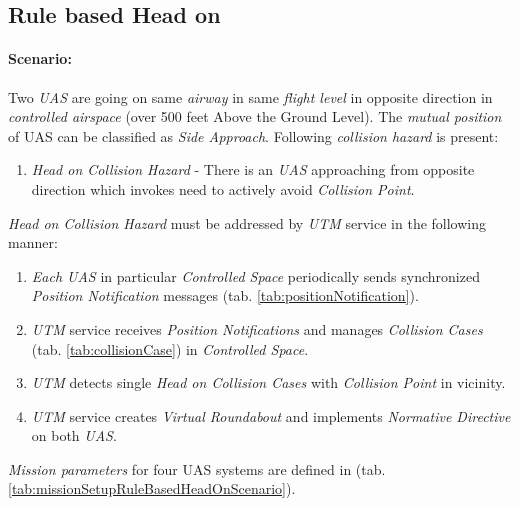 \subsection{Rule based Head on}\label{s:testRuleHeadOn}

\paragraph{Scenario:} Two \emph{UAS} are going on same \emph{airway} in same \emph{flight level} in opposite direction in \emph{controlled airspace} (over 500 feet Above the Ground Level). The \emph{mutual position} of UAS can be classified as \emph{Side Approach}. Following \emph{collision hazard} is present:

\begin{enumerate}
    \item \emph{Head on Collision Hazard} - There is an \emph{UAS} approaching from opposite direction which invokes need to actively avoid \emph{Collision Point}.
\end{enumerate}
      
\noindent\emph{Head on Collision Hazard} must be addressed by \emph{UTM} service in the following manner:
    
\begin{enumerate}
    \item \emph{Each UAS} in particular \emph{Controlled Space} periodically sends synchronized \emph{Position Notification} messages (tab. \ref{tab:positionNotification}). 
    
    \item \emph{UTM} service receives \emph{Position Notifications} and manages \emph{Collision Cases} (tab. \ref{tab:collisionCase}) in \emph{Controlled Space}. 
    
    \item \emph{UTM} detects single \emph{Head on Collision Cases} with \emph{Collision Point} in  vicinity.
    
    \item \emph{UTM} service creates \emph{Virtual Roundabout} and implements \emph{Normative Directive} on both \emph{UAS}.
\end{enumerate}

\noindent\emph{Mission parameters} for four UAS systems are defined in (tab. \ref{tab:missionSetupRuleBasedHeadOnScenario}).

